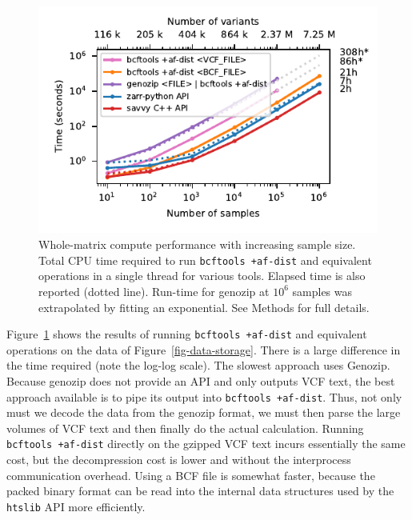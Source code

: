 \documentclass[a4paper,num-refs]{oup-contemporary}
\begin{document}
\begin{figure}
\includegraphics{figures/whole-matrix-compute}
\caption{Whole-matrix compute performance with increasing sample size.
Total CPU time required to run \texttt{bcftools +af-dist}
and equivalent operations in a single thread for various tools.
Elapsed time is also reported (dotted line). Run-time for genozip
at $10^6$ samples was extrapolated by fitting an exponential.
See Methods for full details.
\label{fig-whole-matrix-compute}}
\end{figure}

Figure~\ref{fig-whole-matrix-compute} shows the results of 
running \texttt{bcftools +af-dist} and equivalent operations 
on the data of Figure~\ref{fig-data-storage}. There is a large
difference in the time required (note the log-log scale). 
The slowest approach uses Genozip. Because genozip does not
provide an API and only outputs VCF text, the best approach available 
is to pipe its output into \texttt{bcftools +af-dist}. Thus,
not only must we decode the data from the genozip format, we must 
then parse the large volumes of VCF text and then finally do the 
actual calculation. Running \texttt{bcftools +af-dist} directly
on the gzipped VCF text incurs essentially the same cost, but
the decompression cost is lower and without the interprocess 
communication overhead. Using a BCF file is somewhat faster,
because the packed binary format can be read into the internal 
data structures used by the \texttt{htslib} API more efficiently.
\end{document}
